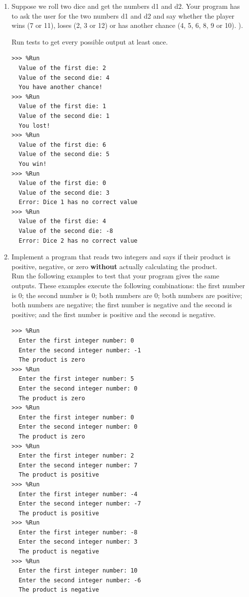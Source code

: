 \begin{enumerate}
\item Suppose we roll two dice and get the numbers d1 and d2. Your program has to ask the user for the two numbers d1 and d2 and say whether the player wins (7 or 11), loses (2, 3 or 12) or has another chance (4, 5, 6, 8, 9 or 10). ).

Run tests to get every possible output at least once.


\begin{Verbatim}[frame=single, label={\em example test execution of the program}]
>>> %Run 
  Value of the first die: 2
  Value of the second die: 4
  You have another chance!
>>> %Run 
  Value of the first die: 1
  Value of the second die: 1
  You lost!
>>> %Run 
  Value of the first die: 6
  Value of the second die: 5
  You win!
>>> %Run 
  Value of the first die: 0
  Value of the second die: 3
  Error: Dice 1 has no correct value
>>> %Run 
  Value of the first die: 4
  Value of the second die: -8
  Error: Dice 2 has no correct value
\end{Verbatim}


\item Implement a program that reads two integers and says if their product is positive, negative, or zero \textbf{without} actually calculating the product. \\

Run the following examples to test that your program gives the same outputs. These examples execute the following combinations: the first number is 0; the second number is 0; both numbers are 0; both numbers are positive; both numbers are negative; the first number is negative and the second is positive; and the first number is positive and the second is negative.



\begin{Verbatim}[frame=single, label={\em example test execution of the program}]
>>> %Run
  Enter the first integer number: 0
  Enter the second integer number: -1
  The product is zero
>>> %Run 
  Enter the first integer number: 5
  Enter the second integer number: 0
  The product is zero
>>> %Run 
  Enter the first integer number: 0
  Enter the second integer number: 0
  The product is zero
>>> %Run
  Enter the first integer number: 2
  Enter the second integer number: 7
  The product is positive
>>> %Run 
  Enter the first integer number: -4
  Enter the second integer number: -7
  The product is positive
>>> %Run 
  Enter the first integer number: -8
  Enter the second integer number: 3
  The product is negative
>>> %Run 
  Enter the first integer number: 10
  Enter the second integer number: -6
  The product is negative
\end{Verbatim}



\end{enumerate}
